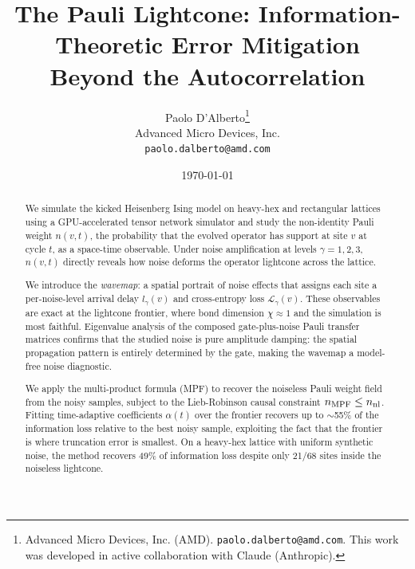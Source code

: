 \documentclass[12pt]{article}
\begin{document}
\title{The Pauli Lightcone: Information-Theoretic Error Mitigation\\
       Beyond the Autocorrelation}

\author{
 Paolo D'Alberto\thanks{Advanced Micro Devices, Inc. (AMD).
 \texttt{paolo.dalberto@amd.com}.
 This work was developed in active collaboration with Claude (Anthropic).}\\
 \small Advanced Micro Devices, Inc.\\
 \small\texttt{paolo.dalberto@amd.com}
}

\date{\today}

\maketitle

\begin{abstract}
We simulate the kicked Heisenberg Ising model on heavy-hex and
rectangular lattices using a GPU-accelerated tensor network simulator
and study the non-identity Pauli weight $n(v,t)$, the probability
that the evolved operator has support at site $v$ at cycle $t$, as a
space-time observable.  Under noise amplification at levels
$\gamma=1,2,3$, $n(v,t)$ directly reveals how noise deforms the
operator lightcone across the lattice.

We introduce the \emph{wavemap}: a spatial portrait of noise effects
that assigns each site a per-noise-level arrival delay $l_\gamma(v)$
and cross-entropy loss $\mathcal{L}_\gamma(v)$.  These observables are
exact at the lightcone frontier, where bond dimension $\chi\approx1$
and the simulation is most faithful.  Eigenvalue analysis of the
composed gate-plus-noise Pauli transfer matrices confirms that the
studied noise is pure amplitude damping: the spatial propagation
pattern is entirely determined by the gate, making the wavemap a
model-free noise diagnostic.

We apply the multi-product formula (MPF) to recover the noiseless
Pauli weight field from the noisy samples, subject to the
Lieb-Robinson causal constraint $n_{\rm MPF} \leq n_{\rm nl}$.
Fitting time-adaptive coefficients $\alpha(t)$ over the frontier
recovers up to $\sim$55\% of the information loss relative to the
best noisy sample, exploiting the fact that the frontier is where
truncation error is smallest.  On a heavy-hex lattice with uniform synthetic noise, the method
recovers 49\% of information loss despite only 21/68 sites inside
the noiseless lightcone.
\end{abstract}
\end{document}
